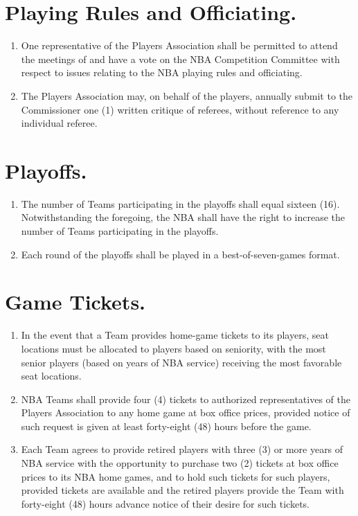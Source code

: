 \documentclass[
]{book}
\providecommand{\tightlist}{%
  \setlength{\itemsep}{0pt}\setlength{\parskip}{0pt}}
\begin{document}
\hypertarget{playing-rules-and-officiating.}{%
\section{Playing Rules and Officiating.}\label{playing-rules-and-officiating.}}

\begin{enumerate}
\def\labelenumi{(\alph{enumi})}
\tightlist
\item
  One representative of the Players Association shall be permitted to attend the meetings of and have a vote on the NBA Competition Committee with respect to issues relating to the NBA playing rules and officiating.
\item
  The Players Association may, on behalf of the players, annually submit to the Commissioner one (1) written critique of referees, without reference to any individual referee.
\end{enumerate}

\hypertarget{playoffs.}{%
\section{Playoffs.}\label{playoffs.}}

\begin{enumerate}
\def\labelenumi{(\alph{enumi})}
\tightlist
\item
  The number of Teams participating in the playoffs shall equal sixteen (16). Notwithstanding the foregoing, the NBA shall have the right to increase the number of Teams participating in the playoffs.
\item
  Each round of the playoffs shall be played in a best-of-seven-games format.
\end{enumerate}

\hypertarget{game-tickets.}{%
\section{Game Tickets.}\label{game-tickets.}}

\begin{enumerate}
\def\labelenumi{(\alph{enumi})}
\tightlist
\item
  In the event that a Team provides home-game tickets to its players, seat locations must be allocated to players based on seniority, with the most senior players (based on years of NBA service) receiving the most favorable seat locations.
\item
  NBA Teams shall provide four (4) tickets to authorized representatives of the Players Association to any home game at box office prices, provided notice of such request is given at least forty-eight (48) hours before the game.
\item
  Each Team agrees to provide retired players with three (3) or more years of NBA service with the opportunity to purchase two (2) tickets at box office prices to its NBA home games, and to hold such tickets for such players, provided tickets are available and the retired players provide the Team with forty-eight (48) hours advance notice of their desire for such tickets.
\end{enumerate}
\end{document}
